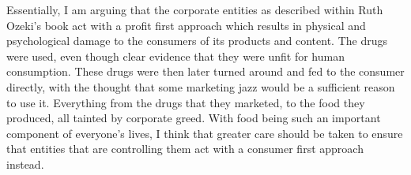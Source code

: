 \documentclass{article}
\begin{document}



Essentially, I am arguing that the corporate entities as described within
Ruth Ozeki's book  act with a profit first approach
which results in physical and psychological damage to the consumers of its
products and content. The drugs were used, even though clear evidence that
they were unfit for human consumption. These drugs were then later turned
around and fed to the consumer directly, with the thought that some
marketing jazz would be a sufficient reason to use it. Everything from the
drugs that they marketed, to the food they produced, all tainted by
corporate greed. With food being such an important component of everyone's
lives, I think that greater care should be taken to ensure that entities
that are controlling them act with a consumer first approach instead.

\makeworkscited
\end{document}
